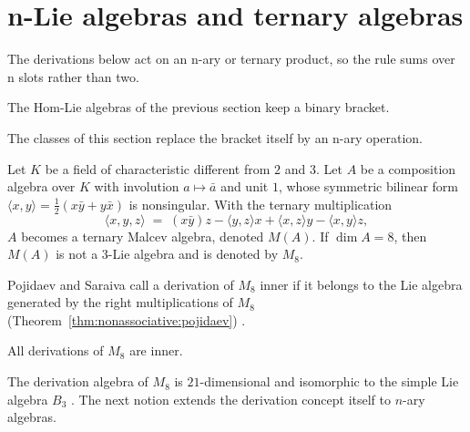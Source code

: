 \section{n-Lie algebras and ternary algebras}\label{sec:nonassociative:n-ary}

The derivations below act on an n-ary or ternary product, so the rule sums over n slots rather than two.

The Hom-Lie algebras of the previous section keep a binary bracket. %

The classes of this section replace the bracket itself by an n-ary
operation. %

\begin{example}
\label{ex:nonassociative:m8}
Let $K$ be a field of characteristic different from $2$ and $3$. Let $A$
be a composition algebra over $K$ with involution $a\mapsto\bar a$ and
unit $1$, whose symmetric bilinear form
$\langle x,y\rangle=\tfrac{1}{2}(x\bar y+y\bar x)$ is nonsingular.
With the ternary multiplication
\[
\langle x,y,z\rangle
\;=\;(x\bar y)z-\langle y,z\rangle x+\langle x,z\rangle y
-\langle x,y\rangle z,
\]
$A$ becomes a ternary Malcev algebra, denoted $M(A)$. If $\dim A=8$, then
$M(A)$ is not a $3$-Lie algebra and is denoted by $M_8$.
\end{example}

Pojidaev and Saraiva call a derivation of $M_8$ inner if it belongs to the
Lie algebra generated by the right multiplications of $M_8$ (Theorem~\ref{thm:nonassociative:pojidaev})
\cite[Section~2, p.~3596]{PojidaevSarahva2006}.\begin{theorem}
\label{thm:nonassociative:pojidaev}
All derivations of $M_8$ are inner.
\end{theorem}

The derivation algebra of $M_8$ is $21$-dimensional and isomorphic to the
simple Lie algebra $B_3$
\cite[Section~2, p.~3598]{PojidaevSarahva2006}. The next notion extends the
derivation concept itself to $n$-ary algebras. %

